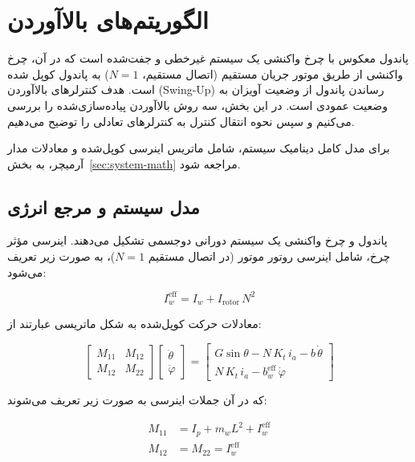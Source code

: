 \section{الگوریتم‌های بالاآوردن}

پاندول معکوس با چرخ واکنشی یک سیستم غیرخطی و جفت‌شده است که در آن، چرخ واکنشی از طریق موتور جریان مستقیم (اتصال مستقیم، $N=1$) به پاندول کوپل شده است. هدف کنترلرهای بالاآوردن (Swing-Up) رساندن پاندول از وضعیت آویزان به وضعیت عمودی است. در این بخش، سه روش بالاآوردن پیاده‌سازی‌شده را بررسی می‌کنیم و سپس نحوه انتقال کنترل به کنترلرهای تعادلی را توضیح می‌دهیم.

برای مدل کامل دینامیک سیستم، شامل ماتریس اینرسی کوپل‌شده و معادلات مدار آرمیچر، به بخش~\ref{sec:system-math} مراجعه شود.

\subsection{مدل سیستم و مرجع انرژی}

پاندول و چرخ واکنشی یک سیستم دورانی دو‌جسمی تشکیل می‌دهند. اینرسی مؤثر چرخ، شامل اینرسی روتور موتور (در اتصال مستقیم $N=1$)، به صورت زیر تعریف می‌شود:

\begin{equation}
    I_w^{\text{eff}} = I_w + I_{\text{rotor}} \, N^2
\end{equation}

معادلات حرکت کوپل‌شده به شکل ماتریسی عبارتند از:

\begin{equation}
    \begin{bmatrix} M_{11} & M_{12} \\ M_{12} & M_{22} \end{bmatrix}
    \begin{bmatrix} \ddot{\theta} \\ \ddot{\varphi} \end{bmatrix}
    =
    \begin{bmatrix} G \sin\theta - N\,K_t\, i_a - b\,\dot\theta \\ N\,K_t\, i_a - b_w^{\text{eff}}\,\dot\varphi \end{bmatrix}
\end{equation}

که در آن جملات اینرسی به صورت زیر تعریف می‌شوند:

\begin{align}
    M_{11} &= I_p + m_w L^2 + I_w^{\text{eff}} \\
    M_{12} &= M_{22} = I_w^{\text{eff}}
\end{align}

